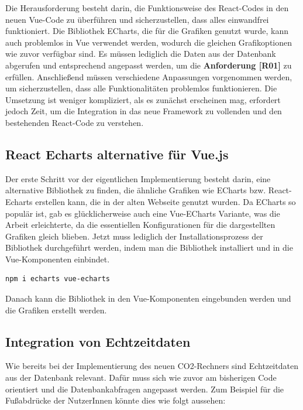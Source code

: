 Die Herausforderung besteht darin, die Funktionsweise des React-Codes in den neuen Vue-Code zu überführen und sicherzustellen, dass alles einwandfrei funktioniert. Die Bibliothek ECharts, die für die Grafiken genutzt wurde, kann auch problemlos in Vue verwendet werden, wodurch die gleichen Grafikoptionen wie zuvor verfügbar sind. Es müssen lediglich die Daten aus der Datenbank abgerufen und entsprechend angepasst werden, um die \textbf{Anforderung [R01]} zu erfüllen. Anschließend müssen verschiedene Anpassungen vorgenommen werden, um sicherzustellen, dass alle Funktionalitäten problemlos funktionieren. Die Umsetzung ist weniger kompliziert, als es zunächst erscheinen mag, erfordert jedoch Zeit, um die Integration in das neue Framework zu vollenden und den bestehenden React-Code zu verstehen.

\subsection{React Echarts alternative für Vue.js}

Der erste Schritt vor der eigentlichen Implementierung besteht darin, eine alternative Bibliothek zu finden, die ähnliche Grafiken wie ECharts bzw. React-Echarts erstellen kann, die in der alten Webseite genutzt wurden. Da ECharts so populär ist, gab es glücklicherweise auch eine Vue-ECharts Variante, was die Arbeit erleichterte, da die essentiellen Konfigurationen für die dargestellten Grafiken gleich blieben. Jetzt muss lediglich der Installationsprozess der Bibliothek durchgeführt werden, indem man die Bibliothek installiert und in die Vue-Komponenten einbindet.

\begin{lstlisting}[language={bash}, caption={Installation von Vue-ECharts}]
npm i echarts vue-echarts
\end{lstlisting}

Danach kann die Bibliothek in den Vue-Komponenten eingebunden werden und die Grafiken erstellt werden. \cite{vue-echarts}

\subsection{Integration von Echtzeitdaten}

Wie bereits bei der Implementierung des neuen CO2-Rechners sind Echtzeitdaten aus der Datenbank relevant. Dafür muss sich wie zuvor am bisherigen Code orientiert und die Datenbankabfragen angepasst werden. Zum Beispiel für die Fußabdrücke der NutzerInnen könnte dies wie folgt aussehen:

